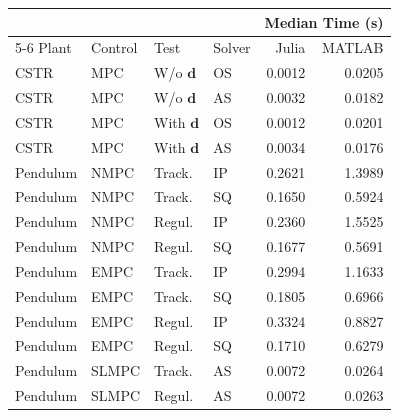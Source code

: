 \begin{tabular}{llllrr}
	
\toprule %

	  &	& & & \multicolumn{2}{c}{Median Time (s)} \\ \cmidrule(l){5-6}
Plant & Control & Test & Solver & Julia & MATLAB \\
\midrule %

CSTR		& MPC	& W/o $\mathbf{d}$	& OS & \num{0.0012} & \num{0.0205}	\\
CSTR		& MPC	& W/o $\mathbf{d}$	& AS & \num{0.0032} & \num{0.0182}	\\
CSTR		& MPC	& With $\mathbf{d}$ & OS & \num{0.0012} & \num{0.0201}	\\
CSTR		& MPC	& With $\mathbf{d}$ & AS & \num{0.0034} & \num{0.0176}	\\
Pendulum 	& NMPC	& Track. 	   		& IP & \num{0.2621} & \num{1.3989}	\\
Pendulum 	& NMPC	& Track. 	   		& SQ & \num{0.1650} & \num{0.5924}	\\
Pendulum    & NMPC	& Regul. 			& IP & \num{0.2360} & \num{1.5525} 	\\
Pendulum    & NMPC	& Regul. 			& SQ & \num{0.1677} & \num{0.5691} 	\\
Pendulum    & EMPC	& Track.			& IP & \num{0.2994} & \num{1.1633} 	\\
Pendulum    & EMPC	& Track.			& SQ & \num{0.1805} & \num{0.6966} 	\\
Pendulum	& EMPC	& Regul. 			& IP & \num{0.3324} & \num{0.8827} 	\\
Pendulum	& EMPC	& Regul. 			& SQ & \num{0.1710} & \num{0.6279}  \\
Pendulum    & SLMPC & Track.			& AS & \num{0.0072} & \num{0.0264}  \\
Pendulum    & SLMPC & Regul.			& AS & \num{0.0072} & \num{0.0263}  \\
	
\bottomrule %
	
\end{tabular}